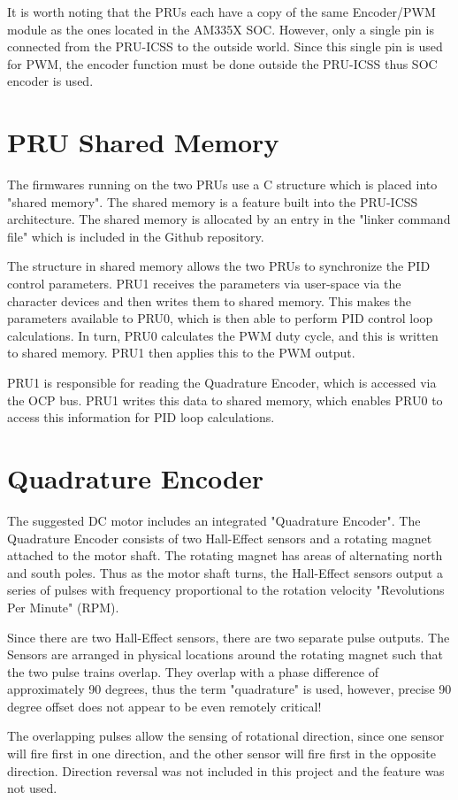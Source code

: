 It is worth noting that the PRUs each have a copy of the same Encoder/PWM module as the ones located in the AM335X SOC.  However, only a single pin is connected from the PRU-ICSS to the outside world.  Since this single pin is used for PWM, the encoder function must be done outside the PRU-ICSS thus SOC encoder is used.

\section{PRU Shared Memory}

The firmwares running on the two PRUs use a C structure which is placed into "shared memory".  The shared memory is a feature built into the PRU-ICSS architecture.  The shared memory is allocated by an entry in the "linker command file" which is included in the Github repository.

The structure in shared memory allows the two PRUs to synchronize the PID control parameters.  PRU1 receives the parameters via user-space via the character devices and then writes them to shared memory.  This makes the parameters available to PRU0, which is then able to perform PID control loop calculations.  In turn, PRU0 calculates the PWM duty cycle, and this is written to shared memory.  PRU1 then applies this to the PWM output.

PRU1 is responsible for reading the Quadrature Encoder, which is accessed via the OCP bus.  PRU1 writes this data to shared memory, which enables PRU0 to access this information for PID loop calculations.


\section{Quadrature Encoder}

The suggested DC motor includes an integrated "Quadrature Encoder".  The Quadrature Encoder consists of two Hall-Effect sensors and a rotating magnet attached to the motor shaft.  The rotating magnet has areas of alternating north and south poles.  Thus as the motor shaft turns, the Hall-Effect sensors output a series of pulses with frequency proportional to the rotation velocity "Revolutions Per Minute" (RPM).

Since there are two Hall-Effect sensors, there are two separate pulse outputs.  The Sensors are arranged in physical locations around the rotating magnet such that the two pulse trains overlap.  They overlap with a phase difference of approximately 90 degrees, thus the term "quadrature" is used, however, precise 90 degree offset does not appear to be even remotely critical!

The overlapping pulses allow the sensing of rotational direction, since one sensor will fire first in one direction, and the other sensor will fire first in the opposite direction.  Direction reversal was not included in this project and the feature was not used.
